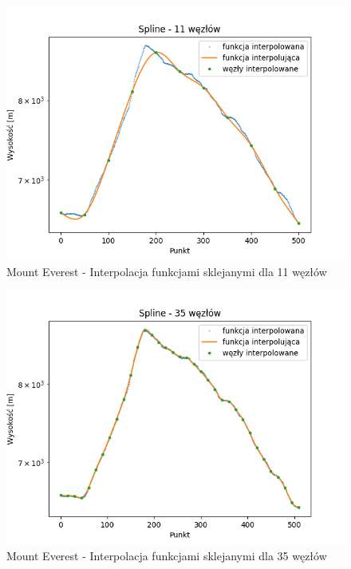 \documentclass[12pt]{extarticle}
\begin{document}
\begin{figure}[H]
    \centering
    \includegraphics[scale=0.8]{interpolation_MountEverest_Spline_11.png}
    \caption{Mount Everest - Interpolacja funkcjami sklejanymi dla 11 węzłów}
\end{figure}
\begin{figure}[H]
    \centering
    \includegraphics[scale=0.8]{interpolation_MountEverest_Spline_35.png}
    \caption{Mount Everest - Interpolacja funkcjami sklejanymi dla 35 węzłów}
\end{figure}
\end{document}
